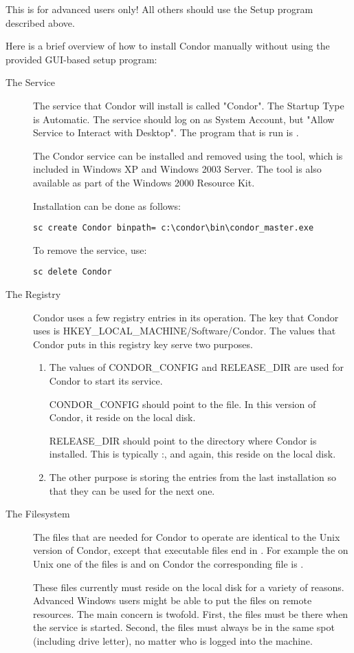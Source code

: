 \Warn This is for advanced users only!  All others should use the Setup program described above. 

Here is a brief overview of how to install Condor manually without using the provided GUI-based setup program:

\begin{description}
\item [The Service]
The service that Condor will install is called "Condor".  The Startup
Type is Automatic.  The service should log on as System Account, but
 "Allow Service to Interact with Desktop".  The
program that is run is .

The Condor service can be installed and removed using the
 tool, which is included in Windows XP and Windows 2003
Server. The tool is also available as part of the Windows 2000
Resource Kit.

Installation can be done as follows:
\begin{verbatim}
sc create Condor binpath= c:\condor\bin\condor_master.exe
\end{verbatim}

To remove the service, use:
\begin{verbatim}
sc delete Condor
\end{verbatim}

\item [The Registry]
Condor uses a few registry entries in its operation.  The key that Condor
uses is HKEY\_LOCAL\_MACHINE/Software/Condor.  The values that Condor puts
in this registry key serve two purposes.
\begin{enumerate}
\item The values of CONDOR\_CONFIG and RELEASE\_DIR are used for Condor
to start its service.

CONDOR\_CONFIG should point to the  file.  In this version
of Condor, it  reside on the local disk.

RELEASE\_DIR should point to the directory where Condor is installed.  This
is typically
\verb@C:\Condor@, and again, this  reside on the
local disk.

\item The other purpose is storing the entries from the last installation
so that they can be used for the next one.
\end{enumerate}

\item [The Filesystem]
The files that are needed for Condor to operate are identical to the Unix
version of Condor, except that executable files end in .  For
example the on Unix one of the files is  and on Condor
the corresponding file is .

These files currently must reside on the local disk for a variety of reasons.
Advanced Windows users might be able to put the files on remote resources.
The main concern is twofold.  First, the files must be there when the service
is started.  Second, the files must always be in the same spot (including
drive letter), no matter who is logged into the machine.  

\end{description}


